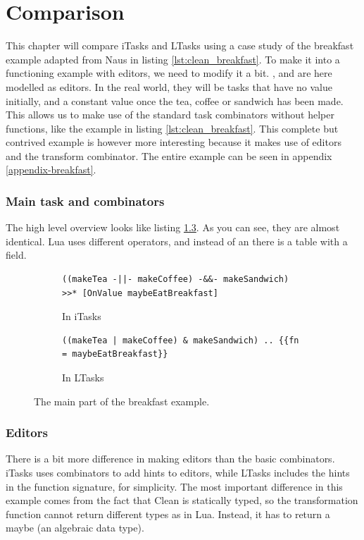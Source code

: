 \chapter{Comparison}\label{comparison}
This chapter will compare iTasks and LTasks using a case study of the breakfast example adapted from Naus \cite{naus2020assisting} in listing \ref{lst:clean_breakfast}. To make it into a functioning example with editors, we need to modify it a bit. ,  and  are here modelled as editors. In the real world, they will be tasks that have no value initially, and a constant value once the tea, coffee or sandwich has been made. This allows us to make use of the standard task combinators without helper functions, like the example in listing \ref{lst:clean_breakfast}. This complete but contrived example is however more interesting because it makes use of editors and the transform combinator. The entire example can be seen in appendix \ref{appendix-breakfast}.

\subsection{Main task and combinators}
The high level overview looks like listing \ref{lst:comparison_breakfast}. As you can see, they are almost identical. Lua uses different operators, and instead of an  there is a table with a  field.

\begin{figure}[ht]
\begin{subfigure}{\textwidth}
\centering
\begin{verbatim}
((makeTea -||- makeCoffee) -&&- makeSandwich) >>* [OnValue maybeEatBreakfast]
\end{verbatim}
\caption{In iTasks}
\label{lst:comparison_breakfast_clean}
\end{subfigure}
\begin{subfigure}{\textwidth}
\centering
\bigskip %
\begin{verbatim}
((makeTea | makeCoffee) & makeSandwich) .. {{fn = maybeEatBreakfast}}
\end{verbatim}
\caption{In LTasks}
\label{lst:comparison_breakfast_lua}
\end{subfigure}
\caption{The main part of the breakfast example.}
\label{lst:comparison_breakfast}
\end{figure}

\subsection{Editors}
There is a bit more difference in making editors than the basic combinators. iTasks uses combinators to add hints to editors, while LTasks includes the hints in the function signature, for simplicity. The most important difference in this example comes from the fact that Clean is statically typed, so the transformation function cannot return different types as in Lua. Instead, it has to return a maybe (an algebraic data type).

